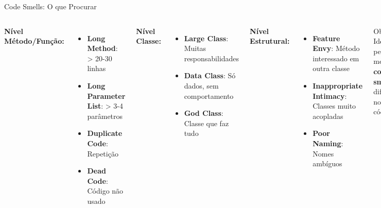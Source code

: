 \documentclass[10pt]{beamer}
\begin{document}
\begin{frame}{Code Smells: O que Procurar}
\begin{columns}[t]
\textbf{Nível Método/Função:}
\begin{itemize}
    \item \textbf{Long Method}: > 20-30 linhas
    \item \textbf{Long Parameter List}: > 3-4 parâmetros  
    \item \textbf{Duplicate Code}: Repetição
    \item \textbf{Dead Code}: Código não usado
\end{itemize}

\textbf{Nível Classe:}
\begin{itemize}
    \item \textbf{Large Class}: Muitas responsabilidades
    \item \textbf{Data Class}: Só dados, sem comportamento
    \item \textbf{God Class}: Classe que faz tudo
\end{itemize}

\textbf{Nível Estrutural:}
\begin{itemize}
    \item \textbf{Feature Envy}: Método interessado em outra classe
    \item \textbf{Inappropriate Intimacy}: Classes muito acopladas
    \item \textbf{Poor Naming}: Nomes ambíguos
\end{itemize}

\vspace{0.3cm}
\begin{alertblock}{Objetivo}
Identificar pelo menos \textbf{3 code smells} diferentes no seu código!
\end{alertblock}
\end{columns}
\end{frame}
\end{document}
